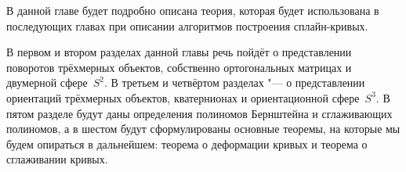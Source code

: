 В данной главе будет подробно описана теория, которая будет использована в последующих главах при описании алгоритмов
построения сплайн-кривых.

В первом и втором разделах данной главы речь пойдёт о представлении поворотов трёхмерных объектов, собственно
ортогональных матрицах и двумерной сфере~$S^2$. В третьем и четвёртом разделах "--- о представлении ориентаций
трёхмерных объектов, кватернионах и ориентационной сфере~$S^3$. В пятом разделе будут даны определения полиномов
Бернштейна и сглаживающих полиномов, а в шестом будут сформулированы основные теоремы, на которые мы будем
опираться в дальнейшем: теорема о деформации кривых и теорема о сглаживании кривых.
